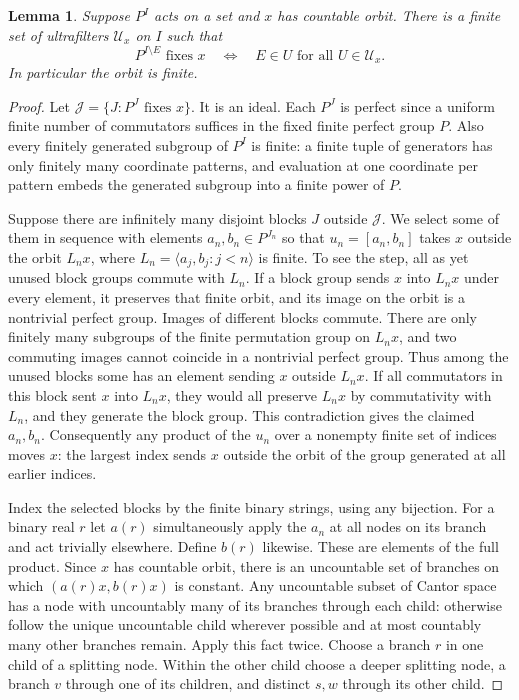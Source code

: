 \documentclass[11pt]{article}
\newtheorem{lemma}[theorem]{Lemma}
\begin{document}
\begin{lemma}\label{ultras}
Suppose $P^I$ acts on a set and $x$ has countable orbit. There is a finite set of ultrafilters $\mathcal U_x$ on $I$ such that
\[
 P^{I\setminus E}\text{ fixes }x
 \quad\Longleftrightarrow\quad E\in U\text{ for all }U\in\mathcal U_x .
\]
In particular the orbit is finite.
\end{lemma}
\begin{proof}
Let $\mathcal J=\{J:P^J\text{ fixes }x\}$. It is an ideal. Each $P^J$ is perfect since a uniform finite number of commutators suffices in the fixed finite perfect group $P$. Also every finitely generated subgroup of $P^I$ is finite: a finite tuple of generators has only finitely many coordinate patterns, and evaluation at one coordinate per pattern embeds the generated subgroup into a finite power of $P$.

Suppose there are infinitely many disjoint blocks $J$ outside $\mathcal J$. We select some of them in sequence with elements $a_n,b_n\in P^{J_n}$ so that $u_n=[a_n,b_n]$ takes $x$ outside the orbit $L_n x$, where $L_n=\langle a_j,b_j:j<n\rangle$ is finite. To see the step, all as yet unused block groups commute with $L_n$. If a block group sends $x$ into $L_n x$ under every element, it preserves that finite orbit, and its image on the orbit is a nontrivial perfect group. Images of different blocks commute. There are only finitely many subgroups of the finite permutation group on $L_n x$, and two commuting images cannot coincide in a nontrivial perfect group. Thus among the unused blocks some has an element sending $x$ outside $L_nx$. If all commutators in this block sent $x$ into $L_nx$, they would all preserve $L_nx$ by commutativity with $L_n$, and they generate the block group. This contradiction gives the claimed $a_n,b_n$. Consequently any product of the $u_n$ over a nonempty finite set of indices moves $x$: the largest index sends $x$ outside the orbit of the group generated at all earlier indices.

Index the selected blocks by the finite binary strings, using any bijection. For a binary real $r$ let $a(r)$ simultaneously apply the $a_n$ at all nodes on its branch and act trivially elsewhere. Define $b(r)$ likewise. These are elements of the full product. Since $x$ has countable orbit, there is an uncountable set of branches on which $(a(r)x,b(r)x)$ is constant. Any uncountable subset of Cantor space has a node with uncountably many of its branches through each child: otherwise follow the unique uncountable child wherever possible and at most countably many other branches remain. Apply this fact twice. Choose a branch $r$ in one child of a splitting node. Within the other child choose a deeper splitting node, a branch $v$ through one of its children, and distinct $s,w$ through its other child.


\end{proof}
\end{document}

